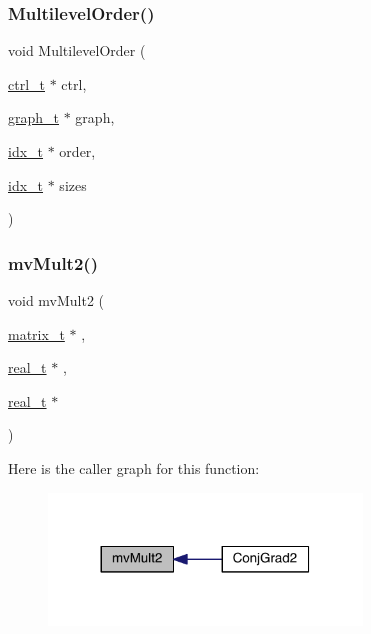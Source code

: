 \subsubsection{\texorpdfstring{Multilevel\+Order()}{MultilevelOrder()}}
{\footnotesize\ttfamily void Multilevel\+Order (\begin{DoxyParamCaption}\item[{\hyperlink{a00742}{ctrl\+\_\+t} $\ast$}]{ctrl,  }\item[{\hyperlink{a00734}{graph\+\_\+t} $\ast$}]{graph,  }\item[{\hyperlink{a00876_aaa5262be3e700770163401acb0150f52}{idx\+\_\+t} $\ast$}]{order,  }\item[{\hyperlink{a00876_aaa5262be3e700770163401acb0150f52}{idx\+\_\+t} $\ast$}]{sizes }\end{DoxyParamCaption})}

\mbox{\label{a00951_aa4a7ca7d45e65b6a33c789d69a747fed}} 
\subsubsection{\texorpdfstring{mv\+Mult2()}{mvMult2()}}
{\footnotesize\ttfamily void mv\+Mult2 (\begin{DoxyParamCaption}\item[{\hyperlink{a00754}{matrix\+\_\+t} $\ast$}]{,  }\item[{\hyperlink{a00876_a1924a4f6907cc3833213aba1f07fcbe9}{real\+\_\+t} $\ast$}]{,  }\item[{\hyperlink{a00876_a1924a4f6907cc3833213aba1f07fcbe9}{real\+\_\+t} $\ast$}]{ }\end{DoxyParamCaption})}

Here is the caller graph for this function\+:\nopagebreak
\begin{figure}[H]
\begin{center}
\leavevmode
\includegraphics[width=236pt]{a00951_aa4a7ca7d45e65b6a33c789d69a747fed_icgraph}
\end{center}
\end{figure}
\mbox{\label{a00951_a1cd76020a48a77b6888d2e53e47bba31}} 
